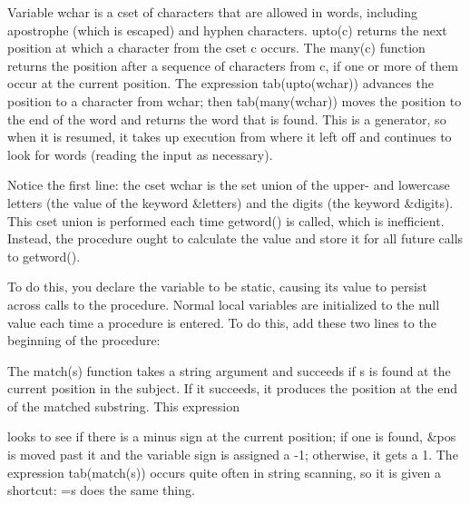 Variable \textsf{wchar}\textsf{ }is a cset of characters that are
allowed in words, including apostrophe (which is escaped) and hyphen
characters. \textsf{upto(c)} returns the next position
at which a character from the cset \textsf{c} occurs. The
\textsf{many(c)} function returns the position after a
sequence of characters from \textsf{c}, if one or more of them occur at
the current position. The expression \textsf{tab(upto(wchar))} advances
the position to a character from \textsf{wchar}; then
\textsf{tab(many(wchar))} moves the position to the end of the word and
returns the word that is found. This is a generator, so when it is
resumed, it takes up execution from where it left off and continues to
look for words (reading the input as necessary).

Notice the first line: the cset \textsf{wchar} is the set union of the
upper- and lowercase letters (the value of the keyword
\textsf{\&letters}) and the digits (the keyword \textsf{\&digits}).
This cset union is performed each time \textsf{getword()} is called,
which is inefficient. Instead, the procedure ought to calculate the
value and store it for all future calls to \textsf{getword()}.

To do this, you declare the variable to be static, causing its value to
persist across calls to the procedure. Normal local variables are
initialized to the null value each time a procedure is entered. To do
this, add these two lines to the beginning of the procedure:


The \textsf{match(s)} function takes a string argument
and succeeds if \textsf{s} is found at the current position in the
subject. If it succeeds, it produces the position at the end of the
matched substring. This expression


\noindent
looks to see if there is a minus sign at the current position; if one is
found, \textsf{\&pos} is moved past it and the variable \textsf{sign}
is assigned a -1; otherwise, it gets a 1. The expression
\textsf{tab(match(s))} occurs quite often in string scanning, so it is
given a shortcut: \textsf{=s} does the same thing.

